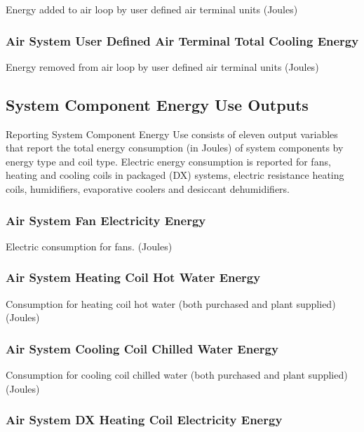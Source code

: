 Energy added to air loop by user defined air terminal units (Joules)

\subsubsection{Air System User Defined Air Terminal Total Cooling Energy}\label{air-system-user-defined-air-terminal-total-cooling-energy}

Energy removed from air loop by user defined air terminal units (Joules)

\subsection{System Component Energy Use Outputs}\label{system-component-energy-use-outputs}

Reporting System Component Energy Use consists of eleven output variables that report the total energy consumption (in Joules) of system components by energy type and coil type. Electric energy consumption is reported for fans, heating and cooling coils in packaged (DX) systems, electric resistance heating coils, humidifiers, evaporative coolers and desiccant dehumidifiers.

\subsubsection{Air System Fan Electricity Energy}\label{air-system-fan-electric-energy}

Electric consumption for fans. (Joules)

\subsubsection{Air System Heating Coil Hot Water Energy}\label{air-system-heating-coil-hot-water-energy}

Consumption for heating coil hot water (both purchased and plant supplied) (Joules)

\subsubsection{Air System Cooling Coil Chilled Water Energy}\label{air-system-cooling-coil-chilled-water-energy}

Consumption for cooling coil chilled water (both purchased and plant supplied) (Joules)

\subsubsection{Air System DX Heating Coil Electricity Energy}\label{air-system-dx-heating-coil-electric-energy}

